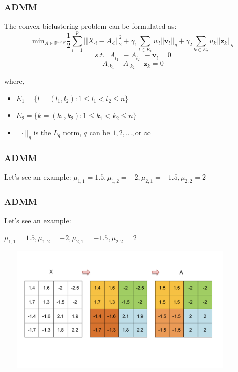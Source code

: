 \documentclass{beamer}
\begin{document}
\begin{frame}
\frametitle{ADMM}
The convex biclustering problem can be formulated as:
$$\text{min}_{A \in \mathbb{R}^{n \times p}}  \frac{1}{2} \sum^p_{i=1} ||X_{\cdot i} - A_{\cdot i}||_2^2 + \gamma_1 \sum_{ l \in E_1 } w_{l} ||\mathbf{v}_l||_{q} + \gamma_2 \sum_{k \in E_2 } u_{k} ||\mathbf{z}_k||_{q}$$
$$s.t. \text{ } A_{l_1 \cdot} - A_{l_2 \cdot} - \mathbf{v}_l = 0$$
\begin{equation}
    A_{\cdot k_1 } - A_{\cdot k_2} - \mathbf{z}_k = 0 \tag{*}
\end{equation}

where,
\begin{itemize}
    \item $E_1 = \{l = (l_1, l_2): 1 \leq l_1 < l_2 \leq n\}$
    \item $E_2 = \{k = (k_1, k_2): 1 \leq k_1 < k_2 \leq n\}$
    \item $|| \cdot ||_q$ is the $L_q$ norm, $q$ can be $1, 2,..., \text{or } \infty$
\end{itemize}
\end{frame}


\begin{frame}
\frametitle{ADMM}
Let's see an example: 
\vfill
$\mu_{1,1} = 1.5, \mu_{1,2} = -2, \mu_{2,1} = -1.5
, \mu_{2,2} = 2$
\centering
{}
\end{frame}

\begin{frame}
\frametitle{ADMM}
Let's see an example: 

$\mu_{1,1} = 1.5, \mu_{1,2} = -2, \mu_{2,1} = -1.5
, \mu_{2,2} = 2$

\centering
    \includegraphics[width=12cm,height=6cm,keepaspectratio]{a4}
\end{frame}

\end{document}
